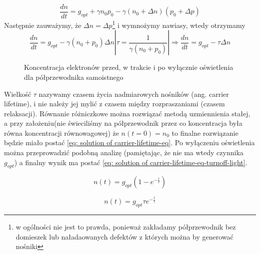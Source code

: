             \begin{equation}
                \frac{dn}{dt} = g_{opt} + \gamma n_0p_0 - \gamma (n_0 + \Delta n)(p_0 + \Delta p) \nonumber
            \end{equation}
            Następnie zauważymy, że $\Delta n = \Delta p$\footnote{w ogólności nie jest to prawda, ponieważ zakładamy półprzewodnik bez domieszek lub naładaowanych defektów z których można by generować nośniki} i wymnożymy nawiasy, wtedy otrzymamy
            \begin{equation}
                \frac{dn}{dt} = g_{opt} - \gamma (n_0 + p_0)\Delta n \left | \tau = \frac{1}{\gamma(n_0 + p_0)} \right| \Rightarrow \frac{dn}{dt} = g_{opt} - \tau\Delta n \label{eq: carrier-lifetime-eq}
            \end{equation}
            \begin{figure}
                \centering
                \caption{Koncentracja elektronów przed, w trakcie i po wyłącznie oświetlenia dla półprzewodnika samoistnego}
            \end{figure}

            
            \noindent Wielkość $\tau$ nazywamy czasem życia nadmiarowych nośników (ang. carrier lifetime), i nie należy jej mylić z czasem między rozpraszaniami (czasem relaksacji). Równanie różniczkowe można rozwiązać metodą uzmiennienia stałej, a przy założeniu(nie świeciliśmy na półprzewodnik przez co koncentracja była równa koncentracji równowagowej) że $n(t=0) = n_0$ to finalne rozwiązanie będzie miało postać \ref{eq: solution of carrier-lifetime-eq}. Po wyłączeniu oświetlenia można przeprowadzić podobną analizę (pamiętając, że nie ma wtedy czynnika $g_{opt}$) a finalny wynik ma postać \ref{eq: solution of carrier-lifetime-eq-turnoff-light}. 
            \newline\newline\newline
            \begin{minipage}[t]{0.49\textwidth}
                \begin{equation}
                    n(t) = g_{opt}\left(1 - e^{-\frac{t}{\tau}}\right) \label{eq: solution of carrier-lifetime-eq}
                \end{equation}
            \end{minipage}
            \hfill
            \begin{minipage}[t]{0.49\textwidth}
                \begin{equation}
                    n(t) = g_{opt}\tau e^{-\frac{t}{\tau}} \label{eq: solution of carrier-lifetime-eq-turnoff-light}
                \end{equation}
            \end{minipage}



